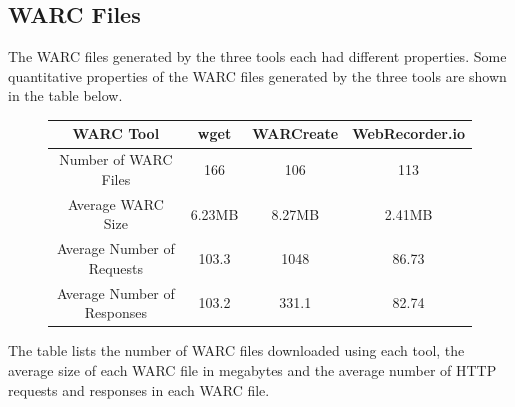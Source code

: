 \documentclass[a4paper,12pt]{article}
\begin{document}
\subsection{WARC Files}
The WARC files generated by the three tools each had different properties. Some quantitative properties of
the WARC files generated by the three tools are shown in the table below.
\begin{figure}[H]
\centering
\begin{tabular}{ | c | c | c | c | }
\hline
WARC Tool                   & wget      & WARCreate & WebRecorder.io    \\ \hline
Number of WARC Files        & 166       & 106       & 113               \\ \hline
Average WARC Size           & 6.23MB    & 8.27MB    & 2.41MB            \\ \hline
Average Number of Requests  & 103.3     & 1048      & 86.73             \\ \hline
Average Number of Responses & 103.2     & 331.1     & 82.74             \\ \hline
\end{tabular}
\end{figure}
The table lists the number of WARC files downloaded using each tool, the average size of each WARC file
in megabytes and the average number of HTTP requests and responses in each WARC file.
\end{document}
